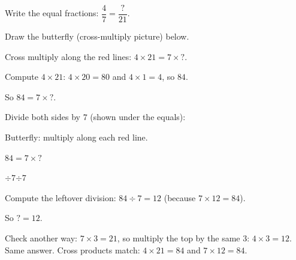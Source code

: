 \begin{steps}
  \item Write the equal fractions: $\dfrac{4}{7} = \dfrac{?}{21}$.
  \item Draw the butterfly (cross-multiply picture) below.
  \item Cross multiply along the red lines: $4 \times 21 = 7 \times {?}$.
  \item Compute $4 \times 21$: $4 \times 20 = 80$ and $4 \times 1 = 4$, so $84$.
  \item So $84 = 7 \times {?}$.
  \item Divide both sides by $7$ (shown under the equals):
    \begin{center}
      \par\smallskip
      Butterfly: multiply along each red line.
      \par\medskip
      $84 = 7 \times {?}$
      \par\smallskip
      \underline{\textcolor{blue!60!black}{$\div 7$\qquad$\div 7$}}
    \end{center}
  \item Compute the leftover division: $84 \div 7 = 12$ (because $7 \times 12 = 84$).
  \item So ${?} = 12$.
\end{steps}


\noindent Check another way: $7 \times 3 = 21$, so multiply the top by the same
$3$: $4 \times 3 = 12$. Same answer. Cross products match: $4 \times 21 = 84$
and $7 \times 12 = 84$.


